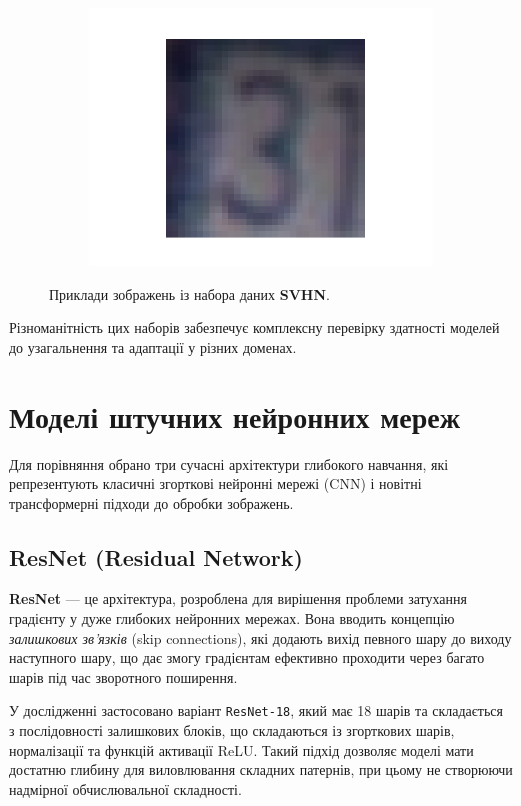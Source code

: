 \documentclass[14pt,a4paper]{extarticle}
\begin{document}
\begin{figure}[htb]
\begin{subfigure}[b]{0.3\textwidth}
    \includegraphics[width=\textwidth]{../res/svhn/sample_8.png}
    \label{fig:svhn_sample_8}
  \end{subfigure}
  
  \caption{Приклади зображень із набора даних \textbf{SVHN}.}
  \label{fig:svhn_samples}
\end{figure}

Різноманітність цих наборів забезпечує комплексну перевірку здатності моделей до узагальнення та адаптації у різних доменах.



\section{Моделі штучних нейронних мереж}
\label{sec:models_}

Для порівняння обрано три сучасні архітектури глибокого навчання, які репрезентують класичні згорткові нейронні мережі (CNN) і новітні трансформерні підходи до обробки зображень.

\subsection{ResNet (Residual Network)}
\textbf{ResNet} --- це архітектура, розроблена для вирішення проблеми затухання градієнту у дуже глибоких нейронних мережах. Вона вводить концепцію \emph{залишкових зв’язків} (skip connections), які додають вихід певного шару до виходу наступного шару, що дає змогу градієнтам ефективно проходити через багато шарів під час зворотного поширення.

У дослідженні застосовано варіант \texttt{ResNet-18}, який має 18 шарів та складається з послідовності залишкових блоків, що складаються із згорткових шарів, нормалізації та функцій активації ReLU. Такий підхід дозволяє моделі мати достатню глибину для виловлювання складних патернів, при цьому не створюючи надмірної обчислювальної складності.
\end{document}
